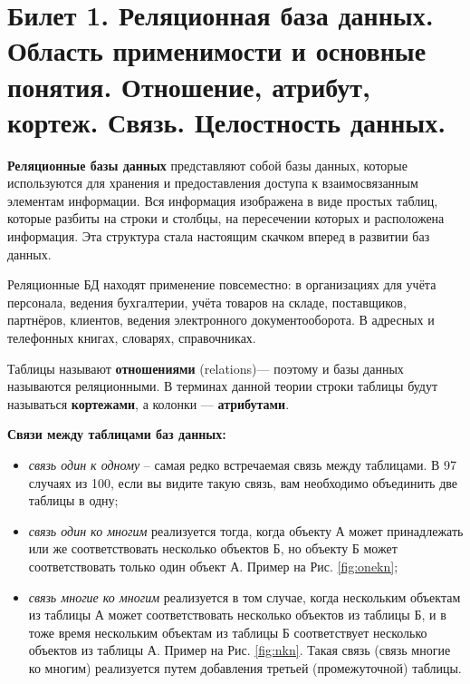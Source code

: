 \newpage
\section{Билет 1. Реляционная база данных. Область применимости и основные понятия. Отношение, атрибут, кортеж. Связь. Целостность данных.}

\textbf{Реляционные базы данных} представляют собой базы данных, которые используются для хранения и предоставления доступа к взаимосвязанным элементам информации. Вся информация изображена в виде простых таблиц, которые разбиты на строки и столбцы, на пересечении которых и расположена информация. Эта структура стала настоящим скачком вперед в развитии баз данных.

Реляционные БД находят применение повсеместно: в организациях для учёта персонала, ведения бухгалтерии, учёта товаров на складе, поставщиков, партнёров, клиентов, ведения электронного документооборота. В адресных и телефонных книгах, словарях, справочниках.

Таблицы называют \textbf{отношениями} (relations)— поэтому и базы данных называются реляционными. В терминах данной теории строки таблицы будут называться \textbf{кортежами}, а колонки — \textbf{атрибутами}.

\textbf{Связи между таблицами баз данных:}
\begin{itemize}
    \item \textit{связь один к одному} – самая редко встречаемая связь между таблицами. В 97 случаях из 100, если вы видите такую связь, вам необходимо объединить две таблицы в одну;
    \item \textit{связь один ко многим} реализуется тогда, когда объекту А может принадлежать или же соответствовать несколько объектов Б, но объекту Б может соответствовать только один объект А. Пример на Рис. \ref{fig:onekn};
    \item \textit{связь многие ко многим} реализуется в том случае, когда нескольким объектам из таблицы А может соответствовать несколько объектов из таблицы Б, и в тоже время нескольким объектам из таблицы Б соответствует несколько объектов из таблицы А. Пример на Рис. \ref{fig:nkn}. Такая связь (связь многие ко многим) реализуется путем добавления третьей (промежуточной) таблицы.
\end{itemize}

